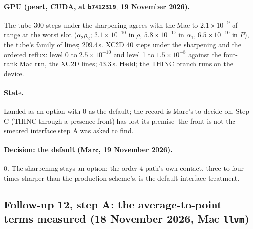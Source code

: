 \documentclass[11pt,a4paper]{article}
\newcommand{\code}[1]{\texttt{\small #1}}
\begin{document}
\paragraph{GPU (peart, CUDA, at \code{b7412319}, 19 November 2026).}
The tube 300 steps under the sharpening agrees with the Mac to
$2.1\times10^{-9}$ of range at the worst slot ($\alpha_2\rho_2$;
$3.1\times10^{-10}$ in $\rho$, $5.8\times10^{-10}$ in $\alpha_1$,
$6.5\times10^{-10}$ in $P$), the tube's family of lines; 209.4\,s.  XC2D
40 steps under the sharpening and the ordered reflux: level 0 to
$2.5\times10^{-10}$ and level 1 to $1.5\times10^{-8}$ against the
four-rank Mac run, the XC2D lines; 43.3\,s.  \textbf{Held}; the THINC
branch runs on the device.

\paragraph{State.}  Landed as an option with 0 as the default; the
record is Marc's to decide on.  Step C (THINC through a presence
front) has lost its premise: the front is not the smeared interface
step A was asked to find.

\paragraph{Decision: the default (Marc, 19 November 2026).}  0.  The
sharpening stays an option; the order-4 path's own contact, three to
four times sharper than the production scheme's, is the default
interface treatment.


\subsection{Follow-up 12, step A: the average-to-point terms measured (18 November 2026, Mac \code{llvm})}
\label{sec:fu12a}
\end{document}
